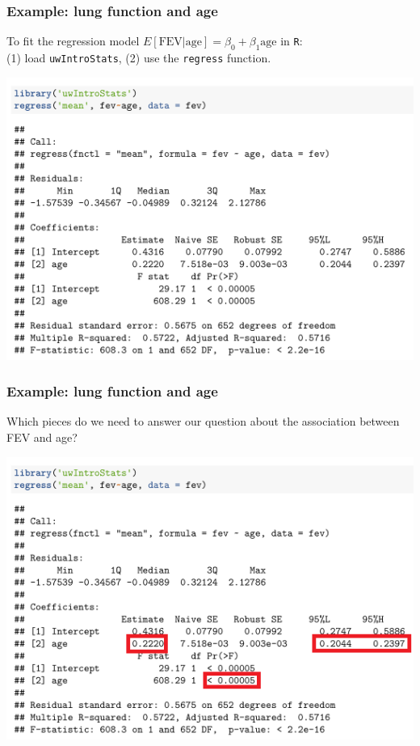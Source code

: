 \documentclass[12pt, 
hyperref={colorlinks=true, linkcolor=blue, urlcolor=cyan}]{beamer}
\begin{document}
\begin{frame}
\frametitle{Example: lung function and age}
To fit the regression model \color{blue} $E[\text{FEV}|\text{age}] = \beta_0 + \beta_1 \text{age}$ \color{black} in \texttt{R}:\\ (1) load \texttt{uwIntroStats}, (2) use the \texttt{regress} function. \vspace{-0.3cm}

\center
\includegraphics[width=0.55\paperwidth]{./plots/regress_fev_vs_age}
\end{frame}

\begin{frame}
\frametitle{Example: lung function and age}
Which pieces do we need to answer our question about the association between FEV and age? \vspace{-0.3cm}

\center
\includegraphics[width=0.55\paperwidth]{./plots/regress_fev_vs_age_highlights}
\end{frame}
\end{document}

